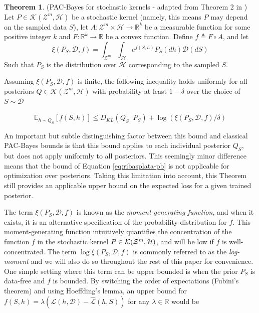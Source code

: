 \documentclass{article}
\theoremstyle{definition}
\newtheorem{theorem}{Theorem}[section]
\newcommand{\Expect}[2]{\mathbb{E}_{#1}\left [#2 \right ]}
\begin{document}
\begin{theorem} (PAC-Bayes for stochastic kernels - adapted from Theorem 2 in \citet{Rivasplata2020}) \label{thm:rivasplata-pb}
	Let $P\in \mathcal{K}(\mathcal{Z}^m, \mathcal{H})$ be a stochastic kernel (namely, this means $P$ may depend on the sampled data $S$), let $A: \mathcal{Z}^m\times \mathcal{H}\rightarrow \mathbb{R}^k$ be a measurable function for some positive integer $k$ and $F:\mathbb{R}^k\rightarrow \mathbb{R}$ be a convex function.
	Define $f\triangleq F\circ A$, and let 
	$$\xi(P_S, \mathcal{D}, f)=\int_{\mathcal{Z}^m}\int_{\mathcal{H}}e^{f(S, h)}P_S(dh)\mathcal{D}(dS)$$
	Such that $P_S$ is the distribution over $\mathcal{H}$ corresponding to the sampled $S$.
	
	Assuming $\xi(P_S, \mathcal{D}, f)$ is finite, the following inequality holds uniformly for all posteriors $Q\in \mathcal{K}(\mathcal{Z}^m, \mathcal{H})$ with probability at least $1-\delta$ over the choice of $S\sim \mathcal{D}$
	
	\begin{equation} \label{eq:ribasplata-pb}
	\Expect{h\sim Q_S}{f(S, h)} \leq D_{KL}(Q_S||P_S)+\log\left (\xi(P_S, \mathcal{D}, f)/\delta\right )
	\end{equation}
\end{theorem}

An important but subtle distinguishing factor between this bound and classical PAC-Bayes bounds is that this bound applies to each individual posterior $Q_S$, but does not apply uniformly to all posteriors. This seemingly minor difference means that the bound of Equation \ref{eq:ribasplata-pb} is not applicable for optimization over posteriors. Taking this limitation into account, this Theorem still provides an applicable upper bound on the expected loss for a given trained posterior.

The term $\xi(P_S, \mathcal{D}, f)$ is known as the \emph{moment-generating function}, and when it exists, it is an alternative specification of the probability distribution for $f$.
This moment-generating function intuitively quantifies the concentration of the function $f$ in the stochastic kernel $P\in{\cal K}({\cal Z}^m,{\cal H})$, and will be low if $f$ is well-concentrated.
The term $\log\xi(P_S, \mathcal{D}, f)$ is commonly referred to as the \emph{log-moment} and we will also do so throughout the rest of this paper for convenience. 
One simple setting where this term can be upper bounded is when the prior $P_S$ is data-free and $f$ is bounded. By switching the order of expectations (Fubini's theorem) and using Hoeffding's lemma, an upper bound for $f(S,h)=\lambda(\mathcal{L}(h,\mathcal{D})-\hat{\mathcal{L}}(h, S))$ for any $\lambda\in \mathbb{R}$ would be
\end{document}
